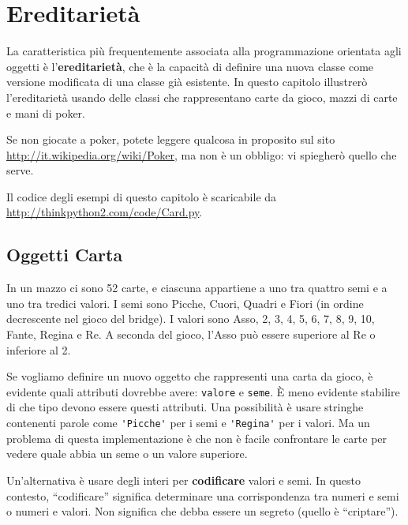 \documentclass[10pt]{book}
\begin{document}
\chapter{Ereditarietà}

La caratteristica più frequentemente associata alla programmazione orientata agli oggetti è l'{\bf ereditarietà}, che è la capacità di definire una nuova classe come versione modificata di una classe già esistente.
In questo capitolo illustrerò l'ereditarietà usando delle classi che rappresentano carte da gioco, mazzi di carte e mani di poker. 

Se non giocate a poker, potete leggere qualcosa in proposito sul sito \url{http://it.wikipedia.org/wiki/Poker}, ma non è un obbligo: vi spiegherò quello che serve.

Il codice degli esempi di questo capitolo è scaricabile da
\url{http://thinkpython2.com/code/Card.py}.


\section{Oggetti Carta}

In un mazzo ci sono 52 carte, e ciascuna appartiene a uno tra quattro semi e a uno tra tredici valori. I semi sono Picche, Cuori, Quadri e Fiori (in ordine decrescente nel gioco del bridge). I valori sono Asso, 2, 3, 4, 5, 6, 7, 8, 9, 10, Fante, Regina e Re. A seconda del gioco, l'Asso può essere superiore al Re o inferiore al 2.

Se vogliamo definire un nuovo oggetto che rappresenti una carta da gioco, è evidente quali attributi dovrebbe avere: {\tt valore} e
{\tt seme}.  È meno evidente stabilire di che tipo devono essere questi attributi. Una possibilità è usare stringhe contenenti parole come
\verb"'Picche'" per i semi e \verb"'Regina'" per i valori. Ma un problema di questa implementazione è che non è facile confrontare le carte per vedere quale abbia un seme o un valore superiore.

Un'alternativa è usare degli interi per {\bf codificare} valori e semi.
In questo contesto, ``codificare'' significa determinare una corrispondenza tra numeri e semi o numeri e valori. Non significa che debba essere un segreto (quello è ``criptare'').

\newcommand{\mymapsto}{$\mapsto$}
\end{document}
